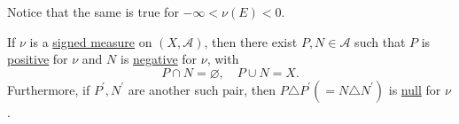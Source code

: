 \begin{remark}
	Notice that the same is true for \(-\infty < \nu (E) < 0\).
\end{remark}

\begin{theorem}\label{thm:Hahn-decomposition}
	If \(\nu\) is a \hyperref[def:signed-measure]{signed measure} on \((X, \mathcal{A})\), then there exist \(P, N \in \mathcal{A}\) such that \(P\) is \hyperref[def:positive-set]{positive} for \(\nu\) and \(N\) is \hyperref[def:negative-set]{negative} for \(\nu\), with
	\[
		P \cap N = \varnothing, \quad P \cup N = X.
	\]
	Furthermore, if \(P^\prime ,N^\prime\) are another such pair, then \(P \triangle P^\prime (= N \triangle N^\prime)\) is \hyperref[def:null-set]{null} for \(\nu\).
	\begin{figure}[H]
		\centering
		\label{fig:thm:Hahn-decomposition}
	\end{figure}
\end{theorem}